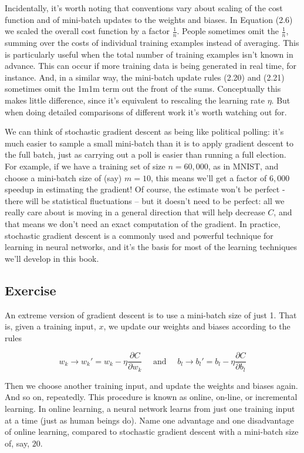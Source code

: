 \documentclass[a4paper,12pt]{report}%
\begin{document}
Incidentally, it's worth noting that conventions vary about scaling of the cost function and of mini-batch updates to the weights and biases. In Equation (2.6) we scaled the overall cost function by a factor $\frac{1}{n}$. People sometimes omit the $\frac{1}{n}$, summing over the costs of individual training examples instead of averaging. This is particularly useful when the total number of training examples isn't known in advance. This can occur if more training data is being generated in real time, for instance. And, in a similar way, the mini-batch update rules (2.20) and (2.21) sometimes omit the 1m1m term out the front of the sums. Conceptually this makes little difference, since it's equivalent to rescaling the learning rate $\eta$. But when doing detailed comparisons of different work it's worth watching out for.

We can think of stochastic gradient descent as being like political polling: it's much easier to sample a small mini-batch than it is to apply gradient descent to the full batch, just as carrying out a poll is easier than running a full election. For example, if we have a training set of size $n=60,000$, as in MNIST, and choose a mini-batch size of (say) $m=10$, this means we'll get a factor of $6,000$ speedup in estimating the gradient! Of course, the estimate won't be perfect - there will be statistical fluctuations -- but it doesn't need to be perfect: all we really care about is moving in a general direction that will help decrease $C$, and that means we don't need an exact computation of the gradient. In practice, stochastic gradient descent is a commonly used and powerful technique for learning in neural networks, and it's the basis for most of the learning techniques we'll develop in this book.

\subsection{Exercise}

An extreme version of gradient descent is to use a mini-batch size of just 1. That is, given a training input, $x$, we update our weights and biases according to the rules
\vspace{-0.5cm}
\begin{center} \begin{equation*}
 w_{k} \rightarrow w_{k}' = w_{k} - \eta \frac{\partial C}{\partial w_{k}}  \mbox{~~~~and~~~~} b_{l} \rightarrow  b_{l}' = b_{l} - \eta \frac{\partial C}{\partial b_{l}}
\end{equation*}\end{center}
Then we choose another training input, and update the weights and biases again. And so on, repeatedly. This procedure is known as online, on-line, or incremental learning. In online learning, a neural network learns from just one training input at a time (just as human beings do). Name one advantage and one disadvantage of online learning, compared to stochastic gradient descent with a mini-batch size of, say, $20$.
\end{document}
